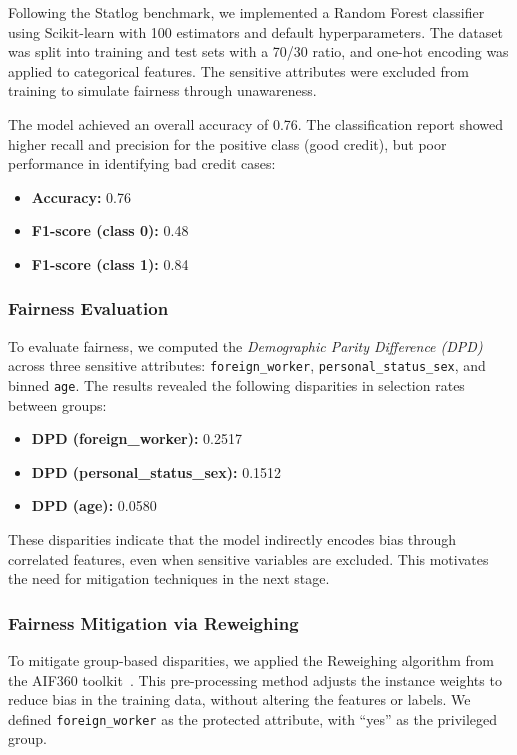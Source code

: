 Following the Statlog benchmark, we implemented a Random Forest classifier using Scikit-learn with 100 estimators and default hyperparameters. The dataset was split into training and test sets with a 70/30 ratio, and one-hot encoding was applied to categorical features. The sensitive attributes were excluded from training to simulate fairness through unawareness.

The model achieved an overall accuracy of 0.76. The classification report showed higher recall and precision for the positive class (good credit), but poor performance in identifying bad credit cases:

\begin{itemize}
    \item \textbf{Accuracy:} 0.76
    \item \textbf{F1-score (class 0):} 0.48
    \item \textbf{F1-score (class 1):} 0.84
\end{itemize}

\subsubsection{Fairness Evaluation}
To evaluate fairness, we computed the \textit{Demographic Parity Difference (DPD)} across three sensitive attributes: \texttt{foreign\_worker}, \texttt{personal\_status\_sex}, and binned \texttt{age}. The results revealed the following disparities in selection rates between groups:

\begin{itemize}
    \item \textbf{DPD (foreign\_worker):} 0.2517
    \item \textbf{DPD (personal\_status\_sex):} 0.1512
    \item \textbf{DPD (age):} 0.0580
\end{itemize}

These disparities indicate that the model indirectly encodes bias through correlated features, even when sensitive variables are excluded. This motivates the need for mitigation techniques in the next stage.
\subsubsection{Fairness Mitigation via Reweighing}

To mitigate group-based disparities, we applied the Reweighing algorithm from the AIF360 toolkit~\cite{aif360}. This pre-processing method adjusts the instance weights to reduce bias in the training data, without altering the features or labels. We defined \texttt{foreign\_worker} as the protected attribute, with “yes” as the privileged group.


